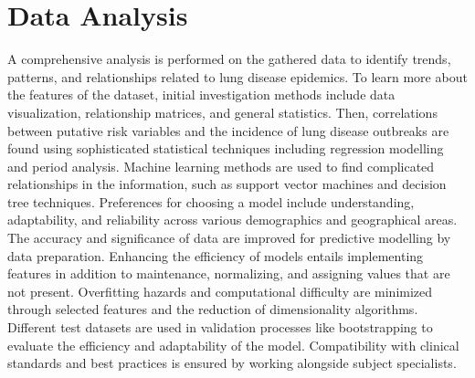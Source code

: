 \section{Data Analysis}
\label{subsec:se_chpters}
A comprehensive analysis is performed on the gathered data to identify trends, patterns, and relationships related to lung disease epidemics. To learn more about the features of the dataset, initial investigation methods include data visualization, relationship matrices, and general statistics. Then, correlations between putative risk variables and the incidence of lung disease outbreaks are found using sophisticated statistical techniques including regression modelling and period analysis. Machine learning methods are used to find complicated relationships in the information, such as support vector machines and decision tree techniques. Preferences for choosing a model include understanding, adaptability, and reliability across various demographics and geographical areas. The accuracy and significance of data are improved for predictive modelling by data preparation. Enhancing the efficiency of models entails implementing features in addition to maintenance, normalizing, and assigning values that are not present. Overfitting hazards and computational difficulty are minimized through selected features and the reduction of dimensionality algorithms. Different test datasets are used in validation processes like bootstrapping to evaluate the efficiency and adaptability of the model. Compatibility with clinical standards and best practices is ensured by working alongside subject specialists.


